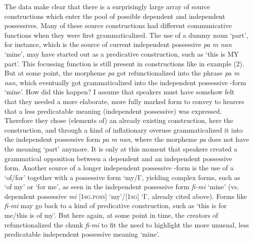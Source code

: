 \documentclass[output=paper]{langsci/langscibook}
\begin{document}
The  data make clear that there is a surprisingly large array of source constructions which enter the pool of possible dependent and independent possessives. Many of these source constructions had different communicative functions when they were first grammaticalized. The use of a dummy noun ‘part’, for instance, which is the source of current  independent possessive \textit{pa m nan} ‘mine’, may have started out as a predicative  construction, such as ‘this is MY part’. This focussing function is still present in constructions like in example (2). But at some point, the morpheme \textit{pa} got refunctionalized into the phrase \textit{pa m nan}, which eventually got grammaticalized into the independent possessive -form ‘mine’. How did this happen? I assume that speakers must have somehow felt that they needed a more elaborate, more fully marked form to convey to hearers that a less predicatable meaning (independent possessive) was expressed. Therefore they chose (elements of) an already existing construction, here the  construction, and through a kind of inflationary overuse grammaticalized it into the independent possessive form \textit{pa m nan}, where the morpheme \textit{pa} does not have the meaning ‘part’ anymore. It is only at this moment that speakers created a grammatical opposition between a dependent and an independent possessive form. 
\newpage
Another source of a longer independent possessive -form is the use of a  ‘of/for’ together with a possessive  form ‘my/I’, yielding complex forms, such as ‘of my’ or ‘for me’, as seen in the  independent possessive form \textit{fi-mi} ‘mine’ (vs. dependent possessive \textit{mi} [\textsc{1sg.poss]} ‘my’/[1\textsc{sg]} ‘I’, already cited above). Forms like \textit{fi-mi} may go back to a kind of predicative construction, such as ‘this is for me/this is of my’. But here again, at some point in time, the creators of  refunctionalized the chunk \textit{fi-mi} to fit the need to highlight the more unusual, less predicatable independent possessive meaning ‘mine’. 
\end{document}
